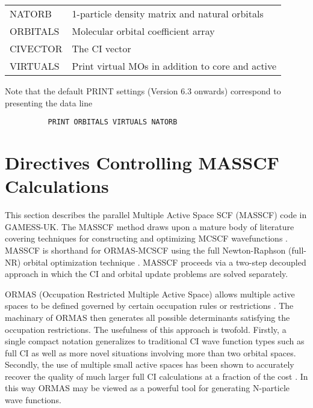 \documentclass[11pt,fleqn]{article}
\begin{document}
\begin{tabular}{ll}
\\ \hline \hline
NATORB     & 1-particle density matrix and natural orbitals \\
ORBITALS   & Molecular orbital coefficient array \\
CIVECTOR   & The CI vector \\
VIRTUALS   & Print virtual MOs in addition to core and active  \\ \hline\hline
\end{tabular}

Note that the default PRINT settings (Version 6.3 onwards) correspond
to presenting the data line

{
\footnotesize
\begin{verbatim}
          PRINT ORBITALS VIRTUALS NATORB
\end{verbatim}
}

\clearpage

\section[Directives Controlling MASSCF Calculations]{Directives Controlling MASSCF Calculations}

This section describes the parallel Multiple Active Space SCF (MASSCF) code 
in GAMESS-UK. The MASSCF method draws upon a mature body of literature 
covering techniques for constructing and optimizing MCSCF 
wavefunctions \cite{mcscf_background}. MASSCF is shorthand for ORMAS-MCSCF 
using the full Newton-Raphson (full-NR) orbital optimization 
technique \cite{fullnr}.  MASSCF proceeds via a two-step decoupled approach 
in which the CI and orbital update problems are solved separately.

ORMAS (Occupation Restricted Multiple Active Space) allows multiple 
active spaces to be defined governed by certain occupation rules or 
restrictions \cite{ormas}. The machinary of ORMAS then generates all possible 
determinants satisfying the occupation restrictions. The usefulness 
of this approach is twofold. Firstly, a single compact notation generalizes 
to traditional CI wave function types such as full CI as well as more 
novel situations involving more than two orbital spaces. Secondly, 
the use of multiple small active spaces has been shown to accurately 
recover the quality of much larger full CI calculations at a fraction 
of the cost \cite{ormas2}. In this way ORMAS may be viewed as a powerful 
tool for generating N-particle wave functions.
\end{document}
